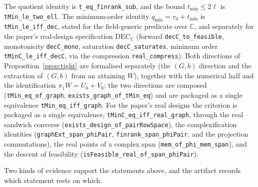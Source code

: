 ﻿\documentclass[journal]{IEEEtran}
\theoremstyle{plainn}
\theoremstyle{remark}
\begin{document}
The quotient identity is \texttt{t\_eq\_finrank\_sub}, and the bound
$t_{\min}\le 2\ell$ is \texttt{tMin\_le\_two\_ell}.  The minimum-order identity
$q_{\min}=r_0+t_{\min}$ is \texttt{tMin\_le\_iff\_dec}, stated for the field-generic predicate over
$\mathbb C$, and separately for the paper's real-design specification $\mathrm{DEC}_{\mathbb C}$
(forward \texttt{decC\_to\_feasible}, monotonicity \texttt{decC\_mono}, saturation
\texttt{decC\_saturates}, minimum order \texttt{tMinC\_le\_iff\_decC}, via the compression
\texttt{real\_compress}).  Both directions of Proposition~\ref{prop:tight} are formalised separately (the
$(G,b)$ direction and the extraction of $(G,b)$ from an attaining $W$), together with the
numerical half and the identification $\pi_1W=U_0+V_0$; the two directions are composed
(\texttt{tMin\_eq\_of\_graph}, \texttt{exists\_graph\_of\_tMin\_eq}) and are packaged as a single
equivalence \texttt{tMin\_eq\_iff\_graph}.  For the paper's real designs the criterion is packaged as a single equivalence,
\texttt{tMinC\_eq\_iff\_real\_graph}, through the real sandwich converse
(\texttt{exists\_design\_of\_pairRowSpace}), the complexification identities
(\texttt{graphExt\_span\_phiPair}, \texttt{finrank\_span\_phiPair}, and the projection
commutations), the real points of a complex span (\texttt{mem\_of\_phi\_mem\_span}), and the
descent of feasibility (\texttt{isFeasible\_real\_of\_span\_phiPair}).

Two kinds of evidence support the statements above, and the artifact records which statement rests on
which.
\end{document}
